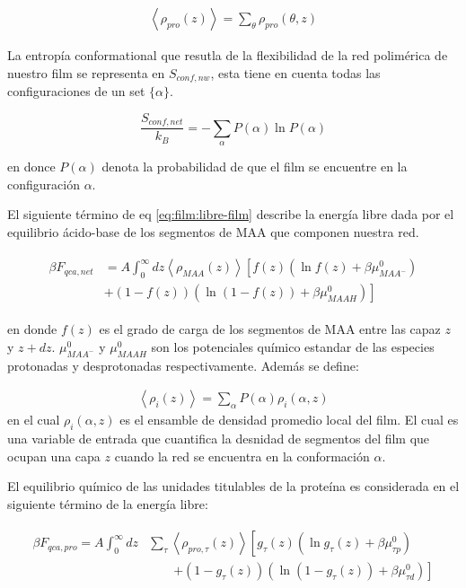 \begin{align}
	\left<\rho_{pro}(z)\right> = \sum_\theta{\rho_{pro}(\theta,z)}
\end{align}


La entrop\'ia conformational que resutla de la flexibilidad de la red polim\'erica de nuestro film se representa en $S_{conf, nw}$, esta tiene en cuenta todas las configuraciones de un set $\{\alpha\}$.

\begin{equation}
	\frac{S_{conf,net}}{k_B} = - \sum_{\alpha}{P(\alpha)\ln P(\alpha)}
\end{equation}

\noindent en donce $P(\alpha)$ denota la probabilidad de que el film se encuentre en la configuraci\'on $\alpha$.

El siguiente t\'ermino de eq \ref{eq:film:libre-film} describe  la energ\'ia libre dada por  el equilibrio \'acido-base de los segmentos de MAA que componen nuestra red. 

\begin{align}
	\begin{aligned}
		\beta F_{qca,net} &= A\int_0^\infty dz \left<\rho_{MAA}(z)\right> \left[f(z)(\ln f(z)+ \beta\mu^0_{MAA^-})\right.\\
		&\left.+(1-f(z))(\ln (1-f(z))+\beta\mu^0_{MAAH})\right]    
	\end{aligned}
\end{align} 

\noindent en donde $f(z)$ es el grado de carga de los segmentos de MAA entre las capaz $z$ y $z + dz$. 
$\mu^0_{MAA^-}$ y $\mu^0_{MAAH}$ son los potenciales qu\'imico estandar  de las especies protonadas y desprotonadas respectivamente.
Adem\'as se define:

\begin{align}
	\left< \rho_i(z)\right> = \sum_\alpha{P(\alpha)\rho_i(\alpha,z)}
\end{align}
\noindent en el cual $\rho_i(\alpha,z)$  es el ensamble de densidad  promedio local del film. El cual es una variable de entrada que cuantifica la desnidad de segmentos del film que  ocupan una capa $z$ cuando la red se encuentra en la conformaci\'on $\alpha$.


El equilibrio qu\'imico de las unidades titulables de la prote\'ina es considerada en el siguiente t\'ermino de la energ\'ia libre:

\begin{align}
	\begin{aligned}
		\beta F_{qca,pro} = A\int_0^\infty dz& \sum_\tau \left<\rho_{pro,\tau}(z)\right> \left[g_\tau(z)(\ln g_\tau(z)+ \beta\mu^0_{\tau p})\right.\\
		&\qquad\left.+(1-g_\tau(z))(\ln (1-g_\tau(z))+\beta\mu^0_{\tau d})\right]   
	\end{aligned}
\end{align} 

